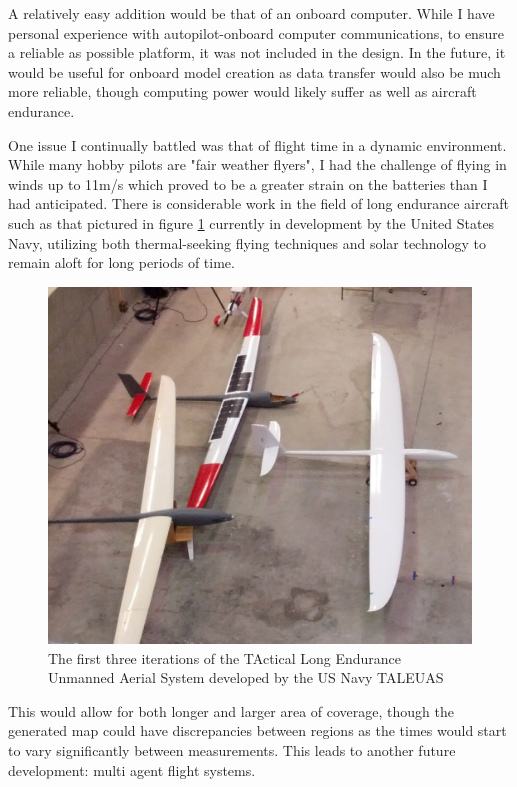 \documentclass[12pt]{report}
\begin{document}
A relatively easy addition would be that of an onboard computer. While I have personal experience with autopilot-onboard computer communications, to ensure a reliable as possible platform, it was not included in the design. In the future, it would be useful for onboard model creation as data transfer would also be much more reliable, though computing power would likely suffer as well as aircraft endurance.

One issue I continually battled was that of flight time in a dynamic environment. While many hobby pilots are "fair weather flyers", I had the challenge of flying in winds up to 11m/s which proved to be a greater strain on the batteries than I had anticipated. There is considerable work in the field of long endurance aircraft such as that pictured in figure \ref{fig:taleaus} currently in development by the United States Navy, utilizing both thermal-seeking flying techniques and solar technology to remain aloft for long periods of time.
\begin{figure}[!ht]
	\centering
	\includegraphics[scale=0.2]{taleaus.jpg}
	\caption{The first three iterations of the TActical Long Endurance Unmanned Aerial System developed by the US Navy TALEUAS \cite{Vogt}}
	\label{fig:taleaus}
\end{figure}
This would allow for both longer and larger area of coverage, though the generated map could have discrepancies between regions as the times would start to vary significantly between measurements. This leads to another future development: multi agent flight systems.
\end{document}
